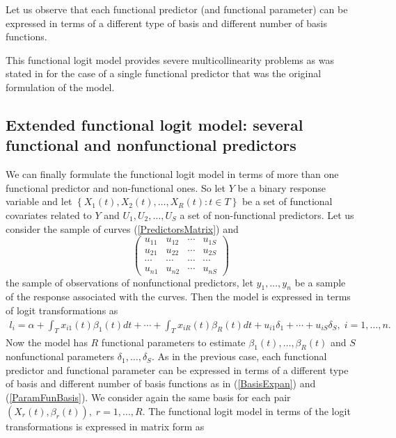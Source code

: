 Let us observe that each functional predictor (and functional parameter) can be expressed in terms of a different type of basis and different number of basis functions.

This functional logit model provides severe multicollinearity problems as was stated in \cite{Escabias04} for the case of a single functional predictor that was the original formulation of the model.

\subsection{Extended functional logit model: several functional and nonfunctional predictors}

We can finally formulate the functional logit model in terms of more than one functional predictor and non-functional ones. So let $Y$ be a binary response variable and let $\left\{X_1\left( t\right),X_2\left( t\right),\ldots,X_R\left( t\right): t\in T\right\} $ be a set of functional covariates related to $Y$ and $U_1,U_2,\ldots,U_S$ a set of non-functional predictors. Let us consider the sample of curves (\ref{PredictorsMatrix}) and
\begin{equation*}
\left( 
\begin{array}{cccc}
u_{11} & u_{12} & \cdots & u_{1S} \\ 
u_{21} & u_{22} & \cdots & u_{2S} \\ 
\cdots & \cdots & \cdots & \cdots \\ 
u_{n1} & u_{n2} & \cdots & u_{nS}
\end{array}
\right)
\end{equation*}
the sample of observations of nonfunctional predictors, let $y_{1},\ldots,y_{n}$ be a sample of the response associated with the curves. Then the model is expressed in terms of logit transformations as
\begin{eqnarray}
l_i =\alpha
+\int_{T}x_{i1}\left( t\right) \beta_1 \left( t\right) dt+\cdots+\int_{T}x_{iR}\left( t\right) \beta_R \left( t\right) dt + u_{i1} \delta_1+\cdots+u_{iS} \delta_S,\; i=1,\ldots ,n.
\label{pclogitfun2}
\end{eqnarray}
Now the model has $R$ functional parameters to estimate $\beta_1\left( t\right),\ldots,\beta_R \left( t\right)$ and $S$ nonfunctional parameters $\delta_1,\ldots,\delta_S.$ As in the previous case, each functional predictor and functional parameter can be expressed in terms of a different type of basis and different number of basis functions as in (\ref{BasisExpan}) and (\ref{ParamFunBasis}). We consider again the same basis for each pair $(X_r(t),\beta_r(t)), \; r=1,\ldots,R.$ The functional logit model in terms of the logit transformations is expressed in matrix form as
